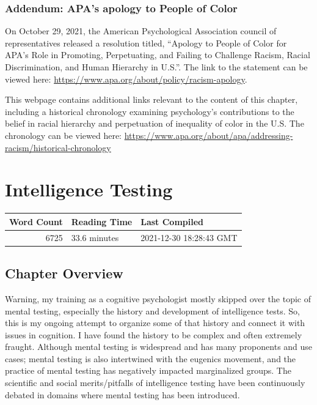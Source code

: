\documentclass[
  oneside,
  12pt]{crumpbook}
\begin{document}
\hypertarget{addendum-apas-apology-to-people-of-color}{%
\subsection{Addendum: APA's apology to People of Color}\label{addendum-apas-apology-to-people-of-color}}

On October 29, 2021, the American Psychological Association council of representatives released a resolution titled, ``Apology to People of Color for APA's Role in Promoting, Perpetuating, and Failing to Challenge Racism, Racial Discrimination, and Human Hierarchy in U.S.''. The link to the statement can be viewed here: \url{https://www.apa.org/about/policy/racism-apology}.

This webpage contains additional links relevant to the content of this chapter, including a historical chronology examining psychology's contributions to the belief in racial hierarchy and perpetuation of inequality of color in the U.S. The chronology can be viewed here: \url{https://www.apa.org/about/apa/addressing-racism/historical-chronology}

\hypertarget{intelligence-testing}{%
\chapter{Intelligence Testing}\label{intelligence-testing}}

\begin{tabular}{r|l|l}
\hline
Word Count & Reading Time & Last Compiled\\
\hline
6725 & 33.6 minutes & 2021-12-30 18:28:43 GMT\\
\hline
\end{tabular}

\hypertarget{chapter-overview-3}{%
\section{Chapter Overview}\label{chapter-overview-3}}

Warning, my training as a cognitive psychologist mostly skipped over the topic of mental testing, especially the history and development of intelligence tests. So, this is my ongoing attempt to organize some of that history and connect it with issues in cognition. I have found the history to be complex and often extremely fraught. Although mental testing is widespread and has many proponents and use cases; mental testing is also intertwined with the eugenics movement, and the practice of mental testing has negatively impacted marginalized groups. The scientific and social merits/pitfalls of intelligence testing have been continuously debated in domains where mental testing has been introduced.
\end{document}

